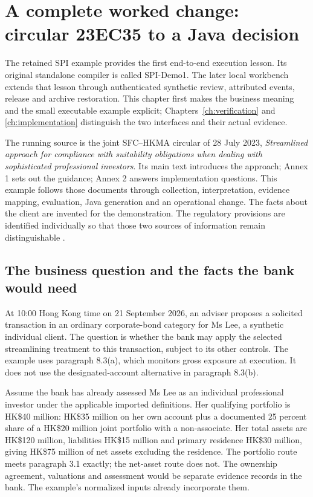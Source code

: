 \documentclass[12pt,a4paper,oneside,openany]{book}
\begin{document}
\section{A complete worked change: circular 23EC35 to a Java decision}

The retained SPI example provides the first end-to-end execution lesson.
Its original standalone compiler is called SPI-Demo1. The later local workbench
extends that lesson through authenticated synthetic review, attributed events,
release and archive restoration. This chapter first makes the business meaning
and the small executable example explicit; Chapters~\ref{ch:verification} and
\ref{ch:implementation} distinguish the two interfaces and their actual evidence.


\label{merge:P-01b-complete-dry-run:00}

\label{sec:dry-run}

The running source is the joint SFC--HKMA circular of 28 July 2023,
\emph{Streamlined approach for compliance with suitability obligations when
dealing with sophisticated professional investors}. Its main text introduces
the approach; Annex 1 sets out the guidance; Annex 2 answers implementation
questions. This example follows those documents through collection,
interpretation, evidence mapping, evaluation, Java generation and an operational
change. The facts about the client are invented for the demonstration. The
regulatory provisions are identified individually so that those two sources of
information remain distinguishable \citep{sfcspi,sfcspiannex1,sfcspiannex2}.

\subsection{The business question and the facts the bank would need}
\label{merge:P-01b-complete-dry-run:01}


At 10:00 Hong Kong time on 21 September 2026, an adviser proposes a solicited
transaction in an ordinary corporate-bond category for Ms Lee, a synthetic
individual client. The question is whether the bank may apply the selected
streamlining treatment to this transaction, subject to its other controls.
The example uses paragraph 8.3(a), which monitors gross exposure at execution.
It does not use the designated-account alternative in paragraph 8.3(b).

Assume the bank has already assessed Ms Lee as an individual professional
investor under the applicable imported definitions. Her qualifying portfolio is
HK\$40 million: HK\$35 million on her own account plus a documented 25 percent
share of a HK\$20 million joint portfolio with a non-associate. Her total assets
are HK\$120 million, liabilities HK\$15 million and primary residence HK\$30
million, giving HK\$75 million of net assets excluding the residence. The
portfolio route meets paragraph 3.1 exactly; the net-asset route does not.
The ownership agreement, valuations and assessment would be separate evidence
records in the bank. The example's normalized inputs already incorporate them.
\end{document}
